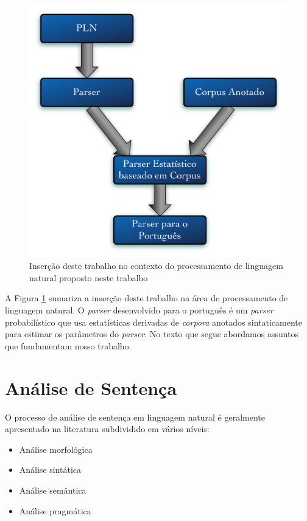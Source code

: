 \begin{figure}[H]
	\begin{center}
		\includegraphics[scale=0.5]{fases.pdf}
		\caption{\label{fases} Inserção deste trabalho no contexto do processamento de linguagem natural proposto neste trabalho}		
	\end{center}
\end{figure}

A Figura \ref{fases} sumariza a inserção deste trabalho na área de processamento de linguagem natural. O \emph{parser} desenvolvido para o português é um \emph{parser} probabilístico que usa estatísticas derivadas de \emph{corpora} anotados sintaticamente para estimar os parâmetros do \emph{parser}. No texto que segue abordamos assuntos que fundamentam nosso trabalho.

\section{Análise de Sentença} %
\label{sec:analise_da_sentenca}

O processo de análise de sentença em linguagem natural é geralmente apresentado na literatura subdividido em vários níveis:

\begin{itemize}
	\item Análise morfológica
	\item Análise sintática
	\item Análise semântica
	\item Análise pragmática
\end{itemize}

